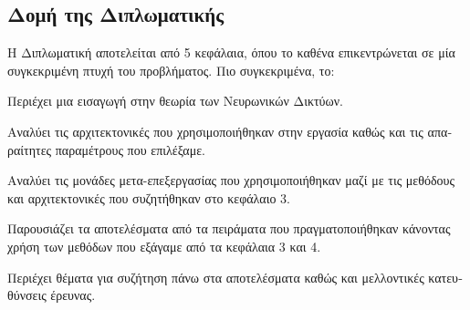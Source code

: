 \subsection{\textgreek{Δομή της Διπλωματικής}}
\textgreek{Η Διπλωματική αποτελείται από 5 κεφάλαια, όπου το καθένα επικεντρώνεται σε μία συγκεκριμένη πτυχή του προβλήματος. Πιο συγκεκριμένα, το:}

\begin{description}[labelindent=1cm, font=$\bullet$~\large\scshape\color{black!50!black}]
  \item [\textgreek{Κεφάλαιο 2}] \textgreek{Περιέχει μια εισαγωγή στην θεωρία των Νευρωνικών Δικτύων.}
  \item [\textgreek{Κεφάλαιο 3}] \textgreek{Αναλύει τις αρχιτεκτονικές που χρησιμοποιήθηκαν στην εργασία καθώς και τις απαραίτητες παραμέτρους που επιλέξαμε.}
\item [\textgreek{Κεφάλαιο 4}] \textgreek{Αναλύει τις μονάδες μετα-επεξεργασίας που χρησιμοποιήθηκαν μαζί με τις μεθόδους και αρχιτεκτονικές που συζητήθηκαν στο κεφάλαιο 3.}
  \item [\textgreek{Κεφάλαιο 5}] \textgreek{Παρουσιάζει τα αποτελέσματα από τα πειράματα που πραγματοποιήθηκαν κάνοντας χρήση των μεθόδων που εξάγαμε από τα κεφάλαια 3 και 4.}
  \item [\textgreek{Κεφάλαιο 6}] \textgreek{Περιέχει θέματα για συζήτηση πάνω στα αποτελέσματα καθώς και μελλοντικές κατευθύνσεις έρευνας.}
\end{description}
%
